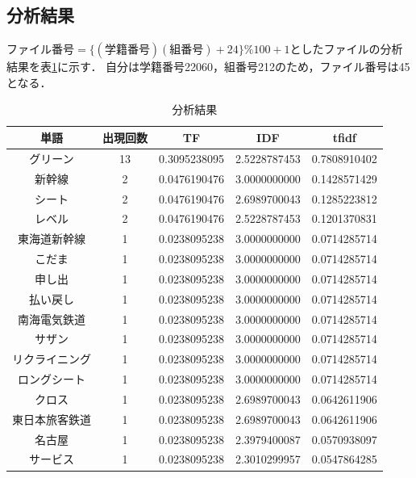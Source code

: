 \documentclass[a4paper,11pt]{ltjsarticle}
\begin{document}
\subsection{分析結果}
$ファイル番号 = \{ (学籍番号) $\cdot$ (組番号) + 24 \} \% 100 + 1$としたファイルの分析結果を表\ref{tab:analysis_result}に示す．
自分は学籍番号22060，組番号212のため，ファイル番号は45となる．
\begin{table}[htbp]
    \centering
    \caption{分析結果}
    \label{tab:analysis_result}
    \begin{tabular}{|c|c|c|c|c|}
        \hline
        単語        & 出現回数 & TF           & IDF          & tfidf        \\
        \hline
        グリーン      & 13   & 0.3095238095 & 2.5228787453 & 0.7808910402 \\
        新幹線       & 2    & 0.0476190476 & 3.0000000000 & 0.1428571429 \\
        シート       & 2    & 0.0476190476 & 2.6989700043 & 0.1285223812 \\
        レベル       & 2    & 0.0476190476 & 2.5228787453 & 0.1201370831 \\
        東海道新幹線    & 1    & 0.0238095238 & 3.0000000000 & 0.0714285714 \\
        こだま       & 1    & 0.0238095238 & 3.0000000000 & 0.0714285714 \\
        申し出       & 1    & 0.0238095238 & 3.0000000000 & 0.0714285714 \\
        払い戻し      & 1    & 0.0238095238 & 3.0000000000 & 0.0714285714 \\
        南海電気鉄道    & 1    & 0.0238095238 & 3.0000000000 & 0.0714285714 \\
        サザン       & 1    & 0.0238095238 & 3.0000000000 & 0.0714285714 \\
        リクライニング   & 1    & 0.0238095238 & 3.0000000000 & 0.0714285714 \\
        ロングシート    & 1    & 0.0238095238 & 3.0000000000 & 0.0714285714 \\
        クロス       & 1    & 0.0238095238 & 2.6989700043 & 0.0642611906 \\
        東日本旅客鉄道   & 1    & 0.0238095238 & 2.6989700043 & 0.0642611906 \\
        名古屋       & 1    & 0.0238095238 & 2.3979400087 & 0.0570938097 \\
        サービス      & 1    & 0.0238095238 & 2.3010299957 & 0.0547864285 \\

\end{tabular}
\end{table}
\end{document}

